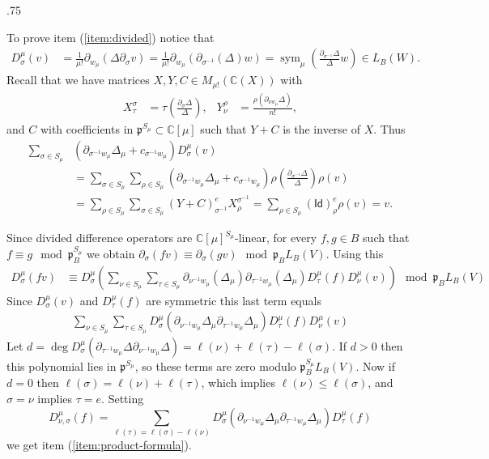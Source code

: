 \documentclass[11pt,fleqn]{article}
\makeatletter
\newcounter{para}[section]
\renewenvironment{proof}[1][\textit{Proof}]{\par
  \pushQED{\qed}%
  \normalfont \topsep.75\paraskip\relax
  \trivlist
  \item[\hskip\labelsep
        \itshape
    #1\@addpunct{.}]\ignorespaces
}{%
  \popQED\endtrivlist\@endpefalse
}
\newcommand\CC{\mathbb C}
\newcommand\p{\mathfrak p}
\DeclareMathOperator\sym{sym}
\makeatother
\begin{document}
\begin{proof}
To prove item (\ref{item:divided}) notice that
\begin{align*}
D^\mu_\sigma(v) 
  &= \frac{1}{\mu!}\partial_{w_\mu} \left(\Delta \partial_{\sigma} v \right)
  = \frac{1}{\mu!}\partial_{w_\mu} \left( 
    \partial_{\sigma^{-1}} (\Delta) w 
  \right) 
  = \sym_{\mu}\left( \frac{\partial_{\sigma^{-1}} \Delta}{\Delta} w\right)
  \in L_B(W).
\end{align*}
Recall that we have matrices $X, Y, C \in M_{\mu!}(\CC(X))$ with
\begin{align*}
X^\sigma_\tau
  &= \tau \left(\frac{\partial_\sigma \Delta}{\Delta} \right),
&Y^\rho_\nu 
  &=\frac{\rho(\partial_{\nu w_\mu} \Delta)}{n!},
\end{align*}
and $C$ with coefficients in $\p^{S_\mu} \subset \CC[\mu]$ such that $Y + C$
is the inverse of $X$. Thus
\begin{align*}
\sum_{\sigma \in S_\mu} &(\partial_{\sigma^{-1}w_\mu}\Delta_\mu 
    + c_{\sigma^{-1}w_\mu}) D^\mu_\sigma(v) \\
    &= \sum_{\sigma \in S_\mu} \sum_{\rho \in S_\mu} 
      (\partial_{\sigma^{-1}w_\mu}\Delta_\mu + c_{\sigma^{-1}w_\mu})
        \rho\left(\frac{\partial_{\sigma^{-1}} \Delta}{\Delta}\right) 
          \rho(v) \\
    &= \sum_{\rho \in S_\mu} \sum_{\sigma \in S_\mu} (Y+C)_{\sigma^{-1}}^e 
      X^{\sigma^{-1}}_\rho
    = \sum_{\rho \in S_\mu} (\mathsf{Id})_{\rho}^e \rho(v) = v.
\end{align*}

Since divided difference operators are $\CC[\mu]^{S_\mu}$-linear, for every 
$f,g \in B$ such that $f \equiv g \mod \p_B^{S_\mu}$ we obtain 
$\partial_\sigma(f v) \equiv \partial_\sigma(g v) \mod \p_B L_B(V)$. Using this
\begin{align*}
D^\mu_\sigma (fv)
  &\equiv D^\mu_\sigma \left(
      \sum_{\nu \in S_\mu} 
        \sum_{\tau \in S_\mu}
          \partial_{\nu^{-1}w_\mu}(\Delta_\mu)
            \partial_{\tau^{-1}w_\mu}(\Delta_\mu)
          D^\mu_\tau(f)D^\mu_\nu (v)
    \right)
    \mod \p_B L_B(V)
\end{align*}
Since $D_\sigma^\mu(v)$ and $D^\mu_\tau(f)$ are symmetric this last term equals
\begin{align*}
\sum_{\nu \in S_\mu} 
  \sum_{\tau \in S_\mu}
    D^\mu_\sigma (\partial_{\nu^{-1}w_\mu}\Delta_\mu
            \partial_{\tau^{-1}w_\mu}\Delta_\mu)
          D^\mu_\tau(f)D^\mu_\nu (v)    
\end{align*}
Let $d = \deg D^\mu_\sigma (\partial_{\tau^{-1}w_\mu} \Delta 
\partial_{\nu^{-1}w_\mu} \Delta) = \ell(\nu) + \ell(\tau) - \ell(\sigma)$. If 
$d > 0$ then this polynomial lies in $\p^{S_\mu}$, so these terms are zero
modulo $\p_B^{S_\mu} L_B(V)$. Now if $d = 0$ then $\ell(\sigma) = \ell(\nu) + 
\ell(\tau)$, which implies $\ell(\nu) \leq \ell(\sigma)$, and $\sigma = \nu$
implies $\tau = e$. Setting
\[
D_{\nu,\sigma}^\mu (f)
  = \sum_{\ell(\tau) = \ell(\sigma) - \ell(\nu)} 
    D^\mu_\sigma (\partial_{\nu^{-1}w_\mu}\Delta_\mu
            \partial_{\tau^{-1}w_\mu}\Delta_\mu)
          D^\mu_\tau(f)
\]
we get item (\ref{item:product-formula}).


\end{proof}
\end{document}
